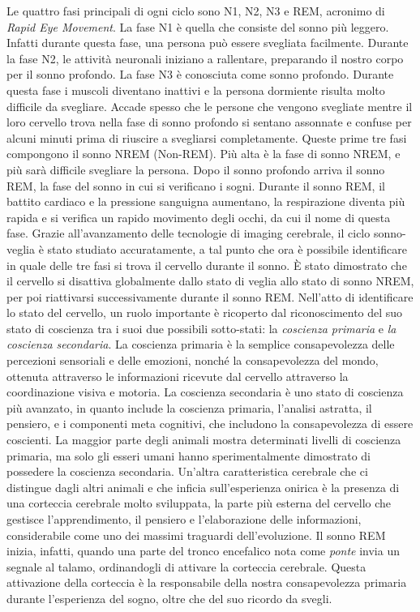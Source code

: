 Le quattro fasi principali di ogni ciclo sono N1, N2, N3 e REM, acronimo di \textit{Rapid Eye Movement}.
La fase N1 è quella che consiste del sonno più leggero.
Infatti durante questa fase, una persona può essere svegliata facilmente.
Durante la fase N2, le attività neuronali iniziano a rallentare, preparando il nostro corpo per il sonno
profondo.
La fase N3 è conosciuta come sonno profondo.
Durante questa fase i muscoli diventano inattivi e la persona dormiente risulta molto difficile da svegliare.
Accade spesso che le persone che vengono svegliate mentre il loro cervello trova nella fase di sonno profondo
si sentano assonnate e confuse per alcuni minuti prima di riuscire a svegliarsi completamente.
Queste prime tre fasi compongono il sonno NREM (Non-REM).
Più alta è la fase di sonno NREM, e più sarà difficile svegliare la persona.
Dopo il sonno profondo arriva il sonno REM, la fase del sonno in cui si verificano i sogni.
Durante il sonno REM, il battito cardiaco e la pressione sanguigna aumentano, la respirazione diventa più rapida e
si verifica un rapido movimento degli occhi, da cui il nome di questa fase.
Grazie all'avanzamento delle tecnologie di imaging cerebrale, il ciclo sonno-veglia è stato studiato accuratamente,
a tal punto che ora è possibile identificare in quale delle tre fasi si trova il cervello durante il sonno.
\`E stato dimostrato che il cervello si disattiva globalmente dallo stato di veglia allo stato di sonno NREM,
per poi riattivarsi successivamente durante il sonno REM\@.
Nell'atto di identificare lo stato del cervello, un ruolo importante è ricoperto dal riconoscimento del suo stato
di coscienza tra i suoi due possibili sotto-stati: la \textit{coscienza primaria} e \textit{la coscienza secondaria}.
La coscienza primaria è la semplice consapevolezza delle percezioni sensoriali e delle emozioni, nonché la consapevolezza
del mondo, ottenuta attraverso le informazioni ricevute dal cervello attraverso la coordinazione visiva e motoria.
La coscienza secondaria è uno stato di coscienza più avanzato, in quanto include la coscienza primaria,
l'analisi astratta, il pensiero, e i componenti meta cognitivi, che includono la consapevolezza di essere coscienti.
La maggior parte degli animali mostra determinati livelli di coscienza primaria, ma solo gli esseri umani
hanno sperimentalmente dimostrato di possedere la coscienza secondaria. %
Un'altra caratteristica cerebrale che ci distingue dagli altri animali e che inficia sull'esperienza
onirica è la presenza di una corteccia cerebrale molto sviluppata, la parte più esterna del cervello che
gestisce l'apprendimento, il pensiero e l'elaborazione delle informazioni, considerabile come uno dei massimi
traguardi dell'evoluzione.
Il sonno REM inizia, infatti, quando una parte del tronco encefalico nota come \textit{ponte} invia un segnale al
talamo, ordinandogli di attivare la corteccia cerebrale.
Questa attivazione della corteccia è la responsabile della nostra consapevolezza primaria durante l'esperienza del
sogno, oltre che del suo ricordo da svegli. \newline

